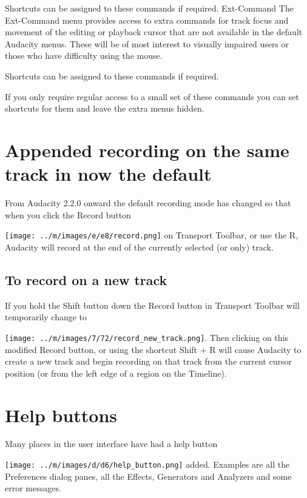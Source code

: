 \documentclass[twocolumn]{book}
\begin{document}
Shortcuts can be assigned to these commands if required.
Ext-Command
The Ext-Command menu provides access to extra commands for track focus and movement of the editing or playback cursor that are not available in the default Audacity menus. These will be of most interest to visually impaired users or those who have difficulty using the mouse.

Shortcuts can be assigned to these commands if required.

If you only require regular access to a small set of these commands you can set shortcuts for them and leave the extra menus hidden.



\section{Appended recording on the same track in now the default}


From Audacity 2.2.0 onward the default recording mode has changed so that when you click the Record button \par\texttt{[image: ../m/images/e/e8/record.png]} on Transport Toolbar, or use the R, Audacity will record at the end of the currently selected (or only) track.

\subsection{To record on a new track}


If you hold the Shift button down the Record button in Transport Toolbar will temporarily change to \par\texttt{[image: ../m/images/7/72/record\_new\_track.png]}. Then clicking on this modified Record button, or using the shortcut Shift + R will cause Audacity to create a new track and begin recording on that track from the current cursor position (or from the left edge of a region on the Timeline). 



\section{Help buttons}


Many places in the user interface have had a help button \par\texttt{[image: ../m/images/d/d6/help\_button.png]} added. Examples are all the Preferences dialog panes, all the Effects, Generators and Analyzers and some error messages.
\end{document}
